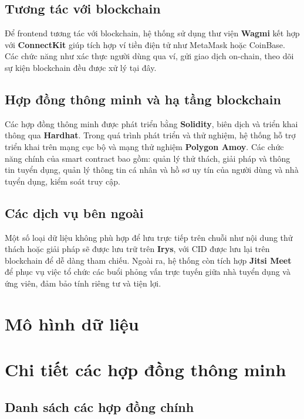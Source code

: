 \subsection{Tương tác với blockchain}

Để frontend tương tác với blockchain, hệ thống sử dụng thư viện \textbf{Wagmi} kết hợp với \textbf{ConnectKit} giúp tích hợp ví tiền điện tử như MetaMask hoặc CoinBase.
Các chức năng như xác thực người dùng qua ví, gửi giao dịch on-chain, theo dõi sự kiện blockchain đều được xử lý tại đây.

\subsection{Hợp đồng thông minh và hạ tầng blockchain}

Các hợp đồng thông minh được phát triển bằng \textbf{Solidity}, biên dịch và triển khai thông qua \textbf{Hardhat}. Trong quá trình phát triển và thử nghiệm, hệ thống hỗ trợ triển khai trên mạng cục bộ và mạng thử nghiệm \textbf{Polygon Amoy}.
Các chức năng chính của smart contract bao gồm: quản lý thử thách, giải pháp và thông tin tuyển dụng, quản lý thông tin cá nhân và hồ sơ uy tín của người dùng và nhà tuyển dụng, kiểm soát truy cập.

\subsection{Các dịch vụ bên ngoài}

Một số loại dữ liệu không phù hợp để lưu trực tiếp trên chuỗi như nội dung thử thách hoặc giải pháp sẽ được lưu trữ trên \textbf{Irys}, với CID được lưu lại trên blockchain để dễ dàng tham chiếu.
Ngoài ra, hệ thống còn tích hợp \textbf{Jitsi Meet} để phục vụ việc tổ chức các buổi phỏng vấn trực tuyến giữa nhà tuyển dụng và ứng viên, đảm bảo tính riêng tư và tiện lợi.

\section{Mô hình dữ liệu}

\section{Chi tiết các hợp đồng thông minh}

\subsection{Danh sách các hợp đồng chính}

